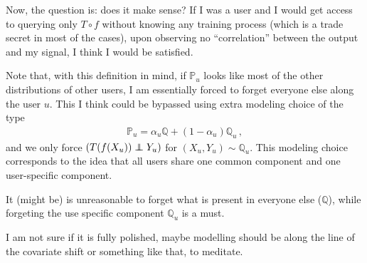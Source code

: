 Now, the question is: does it make sense? If I was a user and I would get access to querying only $T \circ f$ without knowing any training process (which is a trade secret in most of the cases), upon observing no ``correlation'' between the output and my signal, I think I would be satisfied.

Note that, with this definition in mind, if $\mathbb{P}_u$ looks like most of the other distributions of other users, I am essentially forced to forget everyone else along the user $u$. This I think could be bypassed using extra modeling choice of the type
\begin{align*}
    \mathbb{P}_u = \alpha_u\mathbb{Q} + (1 - \alpha_u) \mathbb{Q}_u\,,
\end{align*}
and we only force $(T(f(X_u)) \indep Y_u)$ for $(X_u, Y_u) \sim \mathbb{Q}_u$. This modeling choice corresponds to the idea that all users share one common component and one user-specific component.

It (might be) is unreasonable to forget what is present in everyone else ($\mathbb{Q}$), while forgeting the use specific component $\mathbb{Q}_u$ is a must.

I am not sure if it is fully polished, maybe modelling should be along the line of the covariate shift or something like that, to meditate.


